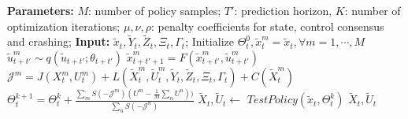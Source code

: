 \begin{algorithm}[t]
\caption{Sampling Optimizer (\acl{SS})}
\begin{algorithmic}[1]
\STATE \textbf{Parameters:} $M$: number of policy samples; $T'$: prediction horizon, $K$: number of optimization iterations; $\mu, \nu, \rho$: penalty coefficients for state, control consensus and crashing;
\STATE \textbf{Input:} $\tilde{x}_t, \tilde{Y}_t, \tilde{Z}_t, \Xi_t, \Gamma_t$;
\STATE Initialize $\Theta_t^0, \tilde{x}^m_t=\tilde{x}_t, \forall m=1,\cdots,M$
\STATE $\tilde{u}^m_{t+t'} \sim q(\tilde{u}_{t+t'}; \theta_{t+t'})$
\STATE $\tilde{x}^m_{t+t'+1} = F(\tilde{x}^m_{t+t'}, \tilde{u}^m_{t+t'})$
\ENDFOR
\STATE $\mathcal{J}^m=J(X^m_t,U^m_t) + L(\tilde{X}^m_t, \tilde{U}^m_t, \tilde{Y}_t, \tilde{Z}_t,\Xi_t, \Gamma_t) + C(\tilde{X}^m_t)$
\ENDFOR
\STATE $\Theta^{k+1}_t = \Theta^k_t + \frac{\sum_{m} S(-\mathcal{J}^m) (U^m - \frac{1}{M}\sum_{n} U^{n}))}{\sum_{n}S(-\mathcal{J}^{n})}$
\ENDFOR
\STATE $\tilde{X}_t, \tilde{U}_t \leftarrow$ $\textit{TestPolicy}(\tilde{x}_t, \Theta^k_t)$
\RETURN $\tilde{X}_t, \tilde{U}_t$
\end{algorithmic}
\label{alg: optimizer}
\end{algorithm}